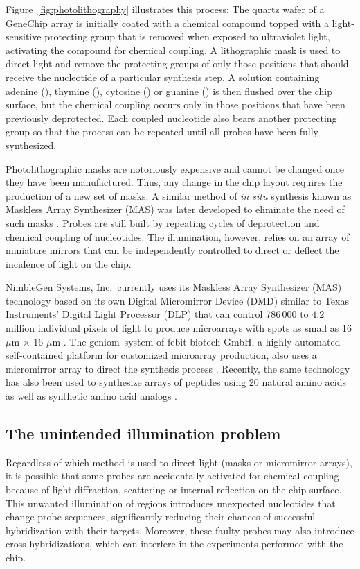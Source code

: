 Figure~\ref{fig:photolithography} illustrates this process: The quartz wafer of
a GeneChip array is initially coated with a chemical compound topped with a
light-sensitive protecting group that is removed when exposed to ultraviolet
light, activating the compound for chemical coupling. A lithographic mask is
used to direct light and remove the protecting groups of only those positions
that should receive the nucleotide of a particular synthesis step.  A solution
containing adenine (\tA), thymine (\tT), cytosine (\tC) or guanine (\tG) is then
flushed over the chip surface, but the chemical coupling occurs only in those
positions that have been previously deprotected. Each coupled nucleotide also
bears another protecting group so that the process can be repeated until all
probes have been fully synthesized.

Photolithographic masks are notoriously expensive and cannot be changed once
they have been manufactured. Thus, any change in the chip layout requires the
production of a new set of masks. A similar method of \emph{in situ} synthesis
known as Maskless Array Synthesizer (MAS) was later developed to eliminate the
need of such masks \citep{Singh-Gasson1999}. Probes are still built by repeating
cycles of deprotection and chemical coupling of nucleotides. The illumination,
however, relies on an array of miniature mirrors that can be independently
controlled to direct or deflect the incidence of light on the chip.

NimbleGen Systems, Inc.\ currently uses its Maskless Array Synthesizer (MAS)
technology based on its own Digital Micromirror Device (DMD) similar to Texas
Instruments' Digital Light Processor (DLP) that can control 786\,000 to $4.2$
million individual pixels of light to produce microarrays with spots as small as
16 $\mu$m $\times$ 16 $\mu$m \citep{Nuwaysir2002}. The {\sffamily geniom}\textR\
system of febit biotech GmbH, a highly-automated self-contained platform for
customized microarray production, also uses a micromirror array to direct the
synthesis process \citep{Baum2003}. Recently, the same technology has also been
used to synthesize arrays of peptides using 20 natural amino acids as well as
synthetic amino acid analogs \citep{Pellois2002,Gao2003,Li2004,Bhushan2006}.

\subsection{The unintended illumination problem}

Regardless of which method is used to direct light (masks or micromirror
arrays), it is possible that some probes are accidentally activated for chemical
coupling because of light diffraction, scattering or internal reflection on the
chip surface. This unwanted illumination of regions introduces unexpected
nucleotides that change probe sequences, significantly reducing their chances of
successful hybridization with their targets. Moreover, these faulty probes may
also introduce cross-hybridizations, which can interfere in the experiments
performed with the chip.

